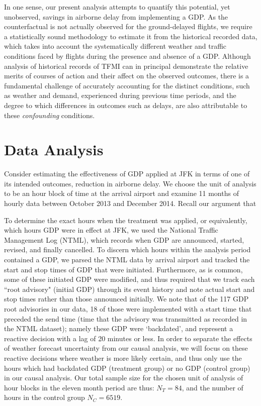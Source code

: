 \documentclass[conference]{IEEEtran}
\begin{document}
In one sense, our present analysis attempts to quantify this potential, yet unobserved, savings in airborne delay from implementing a GDP.  As the counterfactual is not actually observed for the ground-delayed flights, we require a statistically sound methodology to estimate it from the historical recorded data, which takes into account the systematically different weather and traffic conditions faced by flights during the presence and absence of a GDP.  Although analysis of historical records of TFMI can in principal demonstrate the relative merits of courses of action and their affect on the observed outcomes, there is a fundamental challenge of accurately accounting for the distinct conditions, such as weather and demand, experienced during previous time periods, and the degree to which differences in outcomes such as delays, are also attributable to these \emph{confounding} conditions.  
 

\section{Data Analysis}
Consider estimating the effectiveness of GDP applied at JFK in terms of one of its intended outcomes, reduction in airborne delay.  We choose the unit of analysis to be an hour block of time at the arrival airport and examine 11 months of hourly data between October 2013 and December 2014.  Recall our argument that 

To determine the exact hours when the treatment was applied, or equivalently, which hours GDP were in effect at JFK, we used the National Traffic Management Log (NTML), which records when GDP are announced, started, revised, and finally cancelled.  To discern which hours within the analysis period contained a GDP, we parsed the NTML data by arrival airport and tracked the start and stop times of GDP that were initiated.  Furthermore, as is common, some of these initiated GDP were modified, and thus required that we track each ``root advisory" (initial GDP) through its event history and note actual start and stop times rather than those announced initially.  We note that of the 117 GDP root advisories in our data, 18 of those were implemented with a start time that preceded the send time (time that the advisory was transmitted as recorded in the NTML dataset); namely these GDP were `backdated', and represent a reactive decision with a lag of 20 minutes or less.  In order to separate the effects of weather forecast uncertainty from our causal analysis, we will focus on these reactive decisions where weather is more likely certain, and thus only use the hours which had backdated GDP (treatment group) or no GDP (control group) in our causal analysis.  Our total sample size for the chosen unit of analysis of hour blocks in the eleven month period are thus: $N_T=84$, and the number of hours in the control group $N_C=6519$.  
\end{document}
